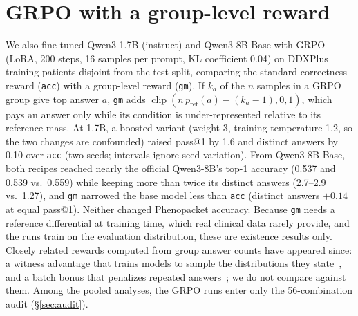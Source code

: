 \documentclass[wcp]{jmlr}
\begin{document}
\section{GRPO with a group-level reward}\label{sec:training}
We also fine-tuned Qwen3-1.7B (instruct) and Qwen3-8B-Base with GRPO (LoRA, 200 steps, 16 samples per prompt, KL coefficient 0.04) on DDXPlus training patients disjoint from the test split, comparing the standard correctness reward (\texttt{acc}) with a group-level reward (\texttt{gm}). If $k_a$ of the $n$ samples in a GRPO group give top answer $a$, \texttt{gm} adds $\operatorname{clip}(n\,p_{\mathrm{ref}}(a) - (k_a - 1), 0, 1)$, which pays an answer only while its condition is under-represented relative to its reference mass. At 1.7B, a boosted variant (weight 3, training temperature 1.2, so the two changes are confounded) raised pass@1 by 1.6 and distinct answers by 0.10 over \texttt{acc} (two seeds; intervals ignore seed variation). From Qwen3-8B-Base, both recipes reached nearly the official Qwen3-8B's top-1 accuracy (0.537 and 0.539 vs.\ 0.559) while keeping more than twice its distinct answers (2.7--2.9 vs.\ 1.27), and \texttt{gm} narrowed the base model less than \texttt{acc} (distinct answers $+0.14$ at equal pass@1). Neither changed Phenopacket accuracy. Because \texttt{gm} needs a reference differential at training time, which real clinical data rarely provide, and the runs train on the evaluation distribution, these are existence results only. Closely related rewards computed from group answer counts have appeared since: a witness advantage that trains models to sample the distributions they state~\citep{arabi2026samplewhat}, and a batch bonus that penalizes repeated answers~\citep{song2025outcome}; we do not compare against them. Among the pooled analyses, the GRPO runs enter only the 56-combination audit (\S\ref{sec:audit}).
\end{document}
